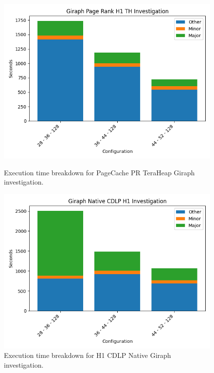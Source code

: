 \begin{figure}[thbp]
    \includegraphics[width=\linewidth]{./fig/g_pr_h1_th.png}
    \caption{Execution time breakdown for PageCache PR TeraHeap
    Giraph investigation.}
    \label{fig:g_pr_pc_th}

    \includegraphics[width=\linewidth]{./fig/g_cdlp_h1_native.png}
    \caption{Execution time breakdown for H1 CDLP Native
    Giraph investigation.}
    \label{fig:g_pr_h1_native}
\end{figure}
\fi

\iffalse
